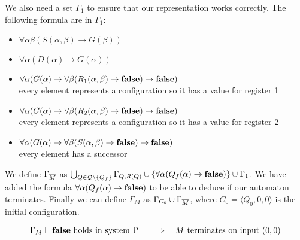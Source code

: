 We also need a set $\Gamma_1$ to ensure that our representation works correctly. The following formula are in $\Gamma_1$:
\begin{itemize}
	\item $\forall\alpha\beta(S(\alpha,\beta)\to G(\beta))$
	\item $\forall\alpha(D(\alpha)\to G(\alpha))$	
	\item $\forall\alpha(G(\alpha)\to\forall\beta(R_1(\alpha,\beta)\to\textbf{false})\to\textbf{false})$\\every element represents a configuration so it has a value for register 1
	\item $\forall\alpha(G(\alpha)\to\forall\beta(R_2(\alpha,\beta)\to\textbf{false})\to\textbf{false})$\\every element represents a configuration so it has a value for register 2
	\item $\forall\alpha(G(\alpha)\to\forall\beta(S(\alpha,\beta)\to\textbf{false})\to\textbf{false})$\\every element has a successor
\end{itemize}
We define $\Gamma_{\overline{M}}$ as $\bigcup_{Q\in\mathcal{Q}\setminus\{Q_f\}}\Gamma_{Q,R(Q)}\cup\{\forall\alpha(Q_f(\alpha)\to\textbf{false})\}\cup\Gamma_1$. We have added the formula $\forall\alpha(Q_f(\alpha)\to\textbf{false})$ to be able to deduce \false{} if our automaton terminates.
Finally we can define $\Gamma_M$ as $\Gamma_{C_0}\cup\Gamma_{\overline{M}}$, where $C_0=\langle Q_0,0,0\rangle$ is the initial configuration.
\begin{claim}\label{cla.17}
	\begin{align*}
		  & \text{$\Gamma_M\vdash\textbf{false}$ holds in system P} &   & \implies & \text{$M$ terminates on input $(0,0)$} 
	\end{align*}
\end{claim}
